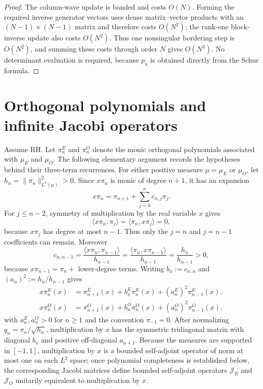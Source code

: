 \documentclass[preprint,12pt]{elsarticle}
\numberwithin{equation}{section}
\theoremstyle{plain}
\theoremstyle{definition}
\theoremstyle{remark}
\newcommand{\RH}{\mathrm{RH}}
\begin{document}
\begin{proof}
The column-wave update is banded and costs \(O(N)\).  Forming the required inverse
generator vectors uses dense matrix--vector products with an \((N-1)\times(N-1)\)
matrix and therefore costs \(O(N^2)\); the rank-one block-inverse update also costs
\(O(N^2)\).  Thus one nonsingular bordering step is \(O(N^2)\), and summing these
costs through order \(N\) gives \(O(N^3)\).  No determinant evaluation is required,
because \(p_n\) is obtained directly from the Schur formula.
\end{proof}





\section{Orthogonal polynomials and infinite Jacobi operators}
\label{sec:jacobi}

Assume $\RH$. Let $\pi_n^E$ and $\pi_n^O$ denote the monic orthogonal polynomials associated with $\mu_E$ and $\mu_O$.  The following elementary argument records the hypotheses behind their three-term recurrences.  For either positive measure $\mu=\mu_E$ or $\mu_O$, let $h_n=\|\pi_n\|_{L^2(\mu)}^2>0$.  Since $x\pi_n$ is monic of degree $n+1$, it has an expansion
\begin{equation}
x\pi_n=\pi_{n+1}+\sum_{j=0}^{n}c_{n,j}\pi_j.
\end{equation}
For $j\le n-2$, symmetry of multiplication by the real variable $x$ gives
\begin{equation}
\langle x\pi_n,\pi_j\rangle
=\langle\pi_n,x\pi_j\rangle=0,
\end{equation}
because $x\pi_j$ has degree at most $n-1$.  Thus only the $j=n$ and $j=n-1$ coefficients can remain.  Moreover
\begin{equation}
c_{n,n-1}
=\frac{\langle x\pi_n,\pi_{n-1}\rangle}{h_{n-1}}
=\frac{\langle\pi_n,x\pi_{n-1}\rangle}{h_{n-1}}
=\frac{h_n}{h_{n-1}}>0,
\end{equation}
because $x\pi_{n-1}=\pi_n+$ lower-degree terms.  Writing
$b_n:=c_{n,n}$ and $(a_n)^2:=h_n/h_{n-1}$ gives
\begin{align}
x\pi_n^E(x)
&=\pi_{n+1}^E(x)+b_n^E\pi_n^E(x)+(a_n^E)^2\pi_{n-1}^E(x),
\label{eq:E_monic_recurrence}\\
x\pi_n^O(x)
&=\pi_{n+1}^O(x)+b_n^O\pi_n^O(x)+(a_n^O)^2\pi_{n-1}^O(x),
\label{eq:O_monic_recurrence}
\end{align}
with $a_n^E,a_n^O>0$ for $n\ge1$ and the convention $\pi_{-1}=0$.  After normalizing $q_n=\pi_n/\sqrt{h_n}$, multiplication by $x$ has the symmetric tridiagonal matrix with diagonal $b_n$ and positive off-diagonal $a_{n+1}$.  Because the measures are supported in $[-1,1]$, multiplication by $x$ is a bounded self-adjoint operator of norm at most one on each $L^2$ space; once polynomial completeness is established below, the corresponding Jacobi matrices define bounded self-adjoint operators $\mathcal J_E$ and $\mathcal J_O$ unitarily equivalent to multiplication by $x$.
\end{document}
